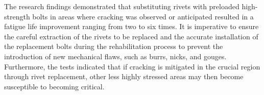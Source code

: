 The research findings \cite{steinhardt1969-hybrid, reemsnyder1975Fatigue} demonstrated that substituting rivets with preloaded high-strength bolts in areas where cracking was observed or anticipated resulted in a fatigue life improvement ranging from two to six times. It is imperative to ensure the careful extraction of the rivets to be replaced and the accurate installation of the replacement bolts during the rehabilitation process to prevent the introduction of new mechanical flaws, such as burrs, nicks, and gouges. Furthermore, the tests indicated that if cracking is mitigated in the crucial region through rivet replacement, other less highly stressed areas may then become susceptible to becoming critical.








